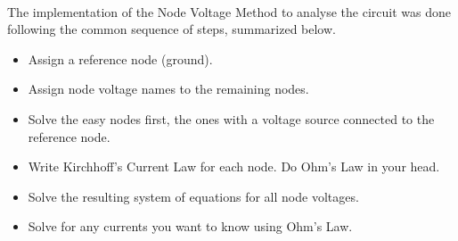 \paragraph{}
The implementation of the Node Voltage Method to analyse the circuit was done following the common sequence of steps, summarized below.
\begin{itemize}
    \item Assign a reference node (ground).
    \item Assign node voltage names to the remaining nodes.
    \item Solve the easy nodes first, the ones with a voltage source connected to the reference node.
    \item Write Kirchhoff's Current Law for each node. Do Ohm's Law in your head.
    \item Solve the resulting system of equations for all node voltages.
    \item Solve for any currents you want to know using Ohm's Law.
\end{itemize}

